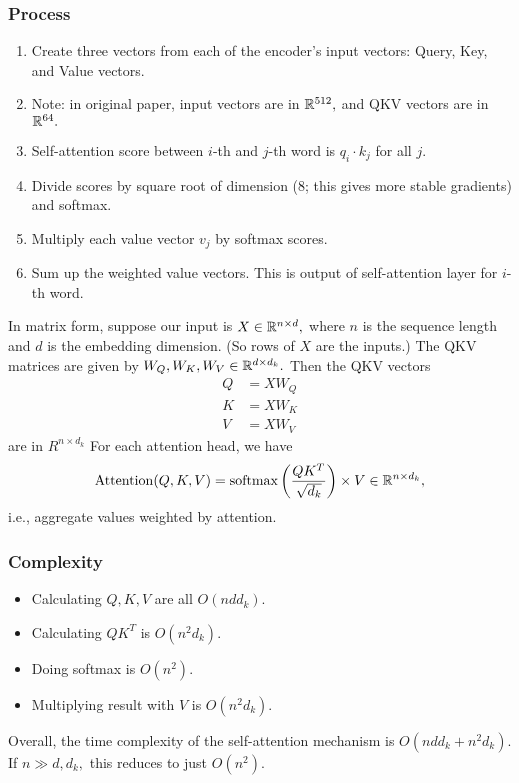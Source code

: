 \subsubsection{Process}
\begin{enumerate}
\item Create three vectors from each of the encoder’s input vectors: Query, Key, and Value vectors.

\item Note: in original paper, input vectors are in $\mathbb{R}^{512},$ and QKV vectors are in $\mathbb{R}^{64}.$

\item Self-attention score between $i$-th and $j$-th word is $q_i \cdot k_j$ for all $j.$

\item Divide scores by square root of dimension (8; this gives more stable gradients) and softmax.

\item Multiply each value vector $v_j$ by softmax scores.

\item Sum up the weighted value vectors. This is output of self-attention layer for $i$-th word.
\end{enumerate}
In matrix form, suppose our input is $X \in \mathbb{R}^{n \times d},$ where $n$ is the sequence length and $d$ is the embedding dimension. (So rows of $X$ are the inputs.) The QKV matrices are given by $W_Q, W_K, W_V \in \mathbb{R}^{d \times d_k}.$ Then the QKV vectors
\begin{align*}
    Q &= XW_Q \\
    K &= XW_K \\
    V &= XW_V
\end{align*}
are in $R^{n \times d_k}$
For each attention head, we have
\[ \operatorname{Attention}(Q,K,V) = \operatorname{softmax}\left(\frac{QK^T}{\sqrt{d_k}}\right) \times V \in \mathbb{R}^{n \times d_k}, \]
i.e., aggregate values weighted by attention.

\subsubsection{Complexity}
\begin{itemize}
    \item Calculating $Q,K,V$ are all $O(ndd_k).$
    \item Calculating $QK^T$ is $O(n^2d_k).$
    \item Doing softmax is $O(n^2).$
    \item Multiplying result with $V$ is $O(n^2d_k).$
\end{itemize}
Overall, the time complexity of the self-attention mechanism is $O(ndd_k + n^2d_k).$ If $n \gg d,d_k,$ this reduces to just $O(n^2).$


